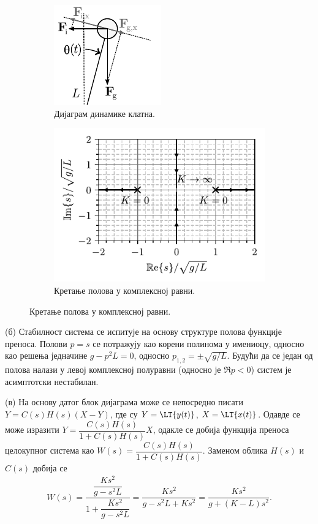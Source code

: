 \begin{figure}[ht!]
    \centering
    \begin{subfigure}{0.39\textwidth}
        \centering
        \includegraphics{fig/klatno_dinamika.pdf}
        \caption{Дијаграм динамике клатна.}
        \label{fig:\ID.2}
    \end{subfigure}
    \begin{subfigure}{0.59\textwidth}
        \centering
        \includegraphics{fig/pmap_klatno_edit.pdf}
        \caption{Кретање полова у комплексној равни.}
        \label{fig:\ID.3}
    \end{subfigure}
\end{figure}


(б) Стабилност система се испитује на основу структуре полова функције преноса. Полови $p=s$ се потражују као корени полинома у имениоцу, односно као 
решења једначине $g - p^2L = 0$, односно $p_{1,2} = \pm \sqrt{g/L}$. Будући да се један од полова налази у левој комплексној полуравни (односно је 
$\Re{p} < 0$) систем је асимптотски нестабилан. 

(в) 
На основу датог блок дијаграма може се непосредно писати 
$Y = C(s)H(s)( X - Y )$, где су $Y = \LT{y(t)}$, $X = \LT{x(t)}$. Одавде се може изразити 
$Y = \dfrac{C(s)H(s)}{1 + C(s)H(s)} X$, одакле се добија функција преноса 
целокупног система као $W(s) = \dfrac{C(s)H(s)}{1 + C(s)H(s)}$. Заменом облика $H(s)$ и $C(s)$ добија се 
\begin{eqnarray}
    W(s) = \dfrac{ \dfrac{Ks^2}{g - s^2L} }{ 1  + \dfrac{Ks^2}{g - s^2L}} = 
    \dfrac{ Ks^2 }{ g - s^2L + Ks^2} = \dfrac{ Ks^2 }{ g + (K-L)s^2}. 
\end{eqnarray}

